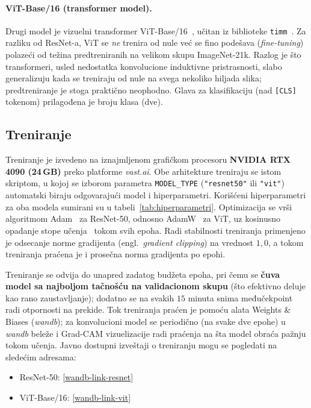 \documentclass[12pt,a4paper]{article}
\begin{document}
\paragraph{ViT-Base/16 (transformer model).}
Drugi model je vizuelni transformer ViT-Base/16~\cite{dosovitskiy2021vit}, učitan iz
biblioteke \texttt{timm}~\cite{wightman2019timm}. Za razliku od ResNet-a, ViT se
\textit{ne} trenira od nule već se fino podešava (\textit{fine-tuning}) polazeći od težina
predtreniranih na velikom skupu ImageNet-21k. Razlog je što transformeri, usled
nedostatka konvolucione induktivne pristrasnosti, slabo generalizuju kada se treniraju od
nule na svega nekoliko hiljada slika; predtreniranje je stoga praktično neophodno. Glava
za klasifikaciju (nad \texttt{[CLS]} tokenom) prilagođena je broju klasa (dve).

\subsection{Treniranje}
\label{sec:trening}

Treniranje je izvedeno na iznajmljenom grafičkom procesoru \textbf{NVIDIA RTX 4090
(24\,GB)} preko platforme \textit{vast.ai}. Obe arhitekture treniraju se istom skriptom,
u kojoj se izborom parametra \texttt{MODEL\_TYPE} (\texttt{"resnet50"} ili \texttt{"vit"})
automatski biraju odgovarajući model i hiperparametri. Korišćeni hiperparametri za oba
modela sumirani su u tabeli~\ref{tab:hiperparametri}. Optimizacija se vrši algoritmom
Adam~\cite{kingma2015adam} za ResNet-50, odnosno AdamW~\cite{loshchilov2019adamw} za ViT,
uz kosinusno opadanje stope učenja~\cite{loshchilov2017sgdr} tokom svih epoha. Radi
stabilnosti treniranja primenjeno je odsecanje norme gradijenta (engl.\ \textit{gradient
clipping}) na vrednost $1{,}0$, a tokom treniranja praćena je i prosečna norma gradijenta
po epohi.

Treniranje se odvija do unapred zadatog budžeta epoha, pri čemu se \textbf{čuva model sa
najboljom tačnošću na validacionom skupu} (što efektivno deluje kao rano zaustavljanje);
dodatno se na svakih $15$ minuta snima međučekpoint radi otpornosti na prekide. Tok
treniranja praćen je pomoću alata Weights \& Biases (\textit{wandb}); za konvolucioni model
se periodično (na svake dve epohe) u \textit{wandb} beleže i Grad-CAM vizuelizacije radi
praćenja na šta model obraća pažnju tokom učenja. Javno dostupni izveštaji o treniranju mogu
se pogledati na sledećim adresama:
\begin{itemize}
  \item ResNet-50: \url{[wandb-link-resnet]}
  \item ViT-Base/16: \url{[wandb-link-vit]}
\end{itemize}
\end{document}
